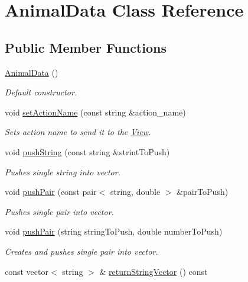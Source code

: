 \hypertarget{class_animal_data}{}\section{Animal\+Data Class Reference}
\label{class_animal_data}
\subsection*{Public Member Functions}
\begin{DoxyCompactItemize}
\item 
\hyperlink{class_animal_data_a19d9316fa054fdf7908874ffb9f96b54}{Animal\+Data} ()
\begin{DoxyCompactList}\small\item\em Default constructor. \end{DoxyCompactList}\item 
void \hyperlink{class_animal_data_a742c6f639bfa120de88ef85afc2d3885}{set\+Action\+Name} (const string \&action\+\_\+name)
\begin{DoxyCompactList}\small\item\em Sets action name to send it to the \hyperlink{class_view}{View}. \end{DoxyCompactList}\item 
void \hyperlink{class_animal_data_ae9f122736669d294bcd03b9187d8552d}{push\+String} (const string \&strint\+To\+Push)
\begin{DoxyCompactList}\small\item\em Pushes single string into vector. \end{DoxyCompactList}\item 
void \hyperlink{class_animal_data_af36b185c412a509f897d7efbc32a3ab9}{push\+Pair} (const pair$<$ string, double $>$ \&pair\+To\+Push)
\begin{DoxyCompactList}\small\item\em Pushes single pair into vector. \end{DoxyCompactList}\item 
void \hyperlink{class_animal_data_a77cd6036400169c5c65b4e966c1eb7b4}{push\+Pair} (string string\+To\+Push, double number\+To\+Push)
\begin{DoxyCompactList}\small\item\em Creates and pushes single pair into vector. \end{DoxyCompactList}\item 
const vector$<$ string $>$ \& \hyperlink{class_animal_data_a97a1647f68e3594c779e78a895d70f6a}{return\+String\+Vector} () const 

\end{DoxyCompactItemize}
